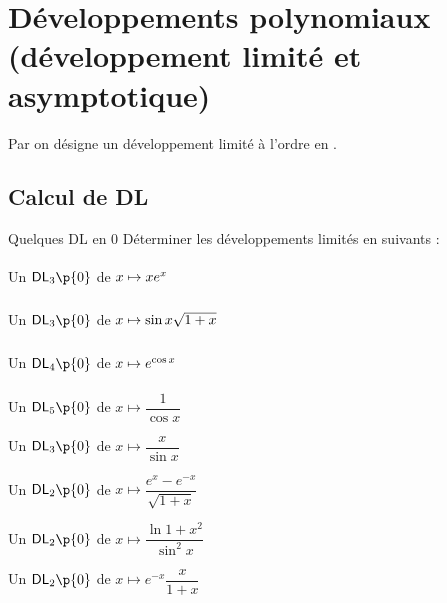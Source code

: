 \documentclass[a4paper,french,bookmarks]{article}
\begin{document}
    
    \initcours{}
    
    \section{Développements polynomiaux (développement limité et asymptotique)}
    
    \begin{notation}
        Par  on désigne un développement limité à l'ordre  en \hg{$\alpha$}. 
    \end{notation}
    
    \subsection{Calcul de DL}
    
    \begin{exercise}{Quelques DL en 0}{}
        \medskip Déterminer les développements limités en suivants :\medskip
        
        \begin{enumerate}
            \begin{minipage}{0.48\linewidth}
                \itt Un $\mathsf{DL}_3\p{0}$ de $x \mapsto xe^x\vphantom{\dfrac{1}{1}}$
            
                \itt Un $\mathsf{DL}_3\p{0}$ de $x \mapsto \sin{x}\sqrt{1 + x}\vphantom{\dfrac{1}{1}}$
            
                \itt Un $\mathsf{DL}_4\p{0}$ de $x \mapsto e^{\cos x}\vphantom{\dfrac{1}{1}}$
                
                \itt Un $\mathsf{DL}_5\p{0}$ de $x \mapsto \dfrac{1}{\cos x}$
            \end{minipage}
            \hfill
            \begin{minipage}{0.48\linewidth}
                \itt Un $\mathsf{DL}_3\p{0}$ de $x \mapsto \dfrac{x}{\sin x}$
                                
                \itt Un $\mathsf{DL}_2\p{0}$ de $x \mapsto \dfrac{e^x - e^{-x}}{\sqrt{1 + x}}$
            
                \itt Un $\mathsf{DL}_2\p{0}$ de $x \mapsto \dfrac{\ln{1+x^2}}{\sin^2 x}$
                
                \itt Un $\mathsf{DL}_2\p{0}$ de $x \mapsto e^{-x}\dfrac{x}{1 + x}$
            \end{minipage}
        \end{enumerate}
    \end{exercise}
    
\end{document}
